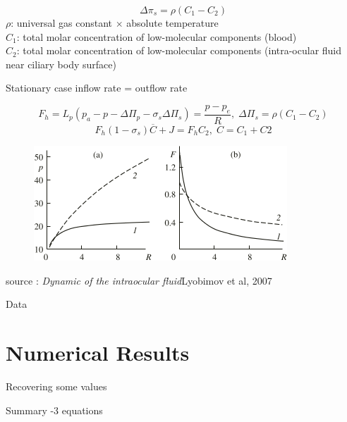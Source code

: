 \begin{frame}
\[
\Delta\pi_{s}= \rho(C_1-C_{2}) 
\]
\small{$\rho$: universal gas constant $\times$  absolute temperature\\
$C_1$: total molar concentration of low-molecular components (blood)\\
$C_2$: total molar concentration of low-molecular components (intra-ocular fluid near ciliary body surface) }

\end{frame}

\begin{frame}{Stationary case}
 inflow rate = outflow rate
\begin{block}{}
\[
F_h = L_p \left(p_a-p-\Delta \Pi_p - \sigma_s \Delta\Pi_s\right) = \frac{p - p_e}{R}, \; \Delta \Pi_s = \rho(C_1-C_2)
\]
\[
F_h (1 - \sigma_s) \overline{C} + J = F_hC_2 , \; \overline{C}= C_1+C2
\]

\end{block}
\begin{figure}[H]
\includegraphics[scale=1]{images/courbes_pr_fr}
\end{figure}
\tiny{source : \textit{Dynamic of the intraocular fluid}Lyobimov et al, 2007}
\end{frame}

\begin{frame}{Data}

\end{frame}

\section{Numerical Results}
\begin{frame}

\end{frame}
\begin{frame}{Recovering some values}
\end{frame}

\begin{frame}{Summary}
-3 equations
\end{frame}


